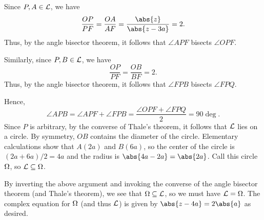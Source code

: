 \begin{solution}
\begin{ppart}
\begin{center}
        \end{center}

        Since $P, A \in \mathcal{L}$, we have \[\frac{OP}{PF} = \frac{OA}{AF} = \frac{\abs{z}}{\abs{z - 3a}} = 2.\] Thus, by the angle bisector theorem, it follows that $\angle APF$ bisects $\angle OPF$.

        Similarly, since $P, B \in \mathcal{L}$, we have \[\frac{OP}{PF} = \frac{OB}{BF} = 2.\] Thus, by the angle bisector theorem, it follows that $\angle FPB$ bisects $\angle FPQ$.

        Hence, \[\angle APB = \angle APF + \angle FPB = \frac{\angle OPF + \angle FPQ}{2} = 90\deg.\] Since $P$ is arbitrary, by the converse of Thale's theorem, it follows that $\mathcal{L}$ lies on a circle. By symmetry, $OB$ contains the diameter of the circle. Elementary calculations show that $A(2a)$ and $B(6a)$, so the center of the circle is $(2a + 6a)/2 = 4a$ and the radius is $\abs{4a - 2a} = \abs{2a}$. Call this circle $\Omega$, so $\mathcal{L} \subseteq \Omega$.

        By inverting the above argument and invoking the converse of the angle bisector theorem (and Thale's theorem), we see that $\Omega \subseteq\mathcal{L}$, so we must have $\mathcal{L} = \Omega$. The complex equation for $\Omega$ (and thus $\mathcal{L}$) is given by $\abs{z - 4a} = 2\abs{a}$ as desired.
    \end{ppart}


\end{solution}
